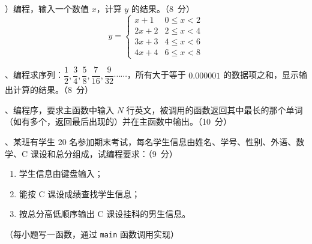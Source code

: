 \documentclass[UTF8,a4paper,10.5pt]{ctexart}
\begin{document}
）编程，输入一个数值 $x$，计算 $y$ 的结果。（8~分）
\[
y = \begin{cases}
x+1 & 0 \le x < 2 \\
2x+2 & 2 \le x < 4 \\
3x+3 & 4 \le x < 6 \\
4x+4 & 6 \le x < 8
\end{cases}
\]

\medskip
{}、编程求序列：$\dfrac{1}{2}, \dfrac{3}{4}, \dfrac{5}{8}, \dfrac{7}{16}, \dfrac{9}{32} \cdots\cdots$，所有大于等于 $0.000001$ 的数据项之和，显示输出计算的结果。（8~分）

\medskip
{}、编程序，要求主函数中输入 $N$ 行英文，被调用的函数返回其中最长的那个单词（如有多个，返回最后出现的）并在主函数中输出。（10~分）

\medskip
{}、某班有学生 20 名参加期末考试，每名学生信息由姓名、学号、性别、外语、数学、C 课设和总分组成，试编程要求：（9~分）
\begin{enumerate}[label=(\arabic*), leftmargin=2.2em, itemsep=2pt]
    \item 学生信息由键盘输入；
    \item 能按 C 课设成绩查找学生信息；
    \item 按总分高低顺序输出 C 课设挂科的男生信息。
\end{enumerate}
\noindent （每小题写一函数，通过 \texttt{main} 函数调用实现）
\end{document}
